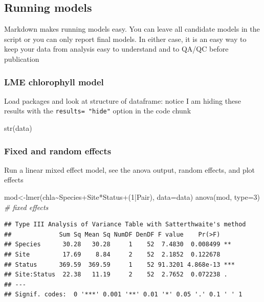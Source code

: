 \documentclass[
]{article}
\newenvironment{Shaded}{\begin{snugshade}}{\end{snugshade}}
\newcommand{\AttributeTok}[1]{\textcolor[rgb]{0.77,0.63,0.00}{#1}}
\newcommand{\CommentTok}[1]{\textcolor[rgb]{0.56,0.35,0.01}{\textit{#1}}}
\newcommand{\DecValTok}[1]{\textcolor[rgb]{0.00,0.00,0.81}{#1}}
\newcommand{\FunctionTok}[1]{\textcolor[rgb]{0.00,0.00,0.00}{#1}}
\newcommand{\NormalTok}[1]{#1}
\newcommand{\OtherTok}[1]{\textcolor[rgb]{0.56,0.35,0.01}{#1}}
\newcommand{\SpecialCharTok}[1]{\textcolor[rgb]{0.00,0.00,0.00}{#1}}
\begin{document}
\hypertarget{running-models}{%
\subsection{Running models}\label{running-models}}

Markdown makes running models easy. You can leave all candidate models
in the script or you can only report final models. In either case, it is
an easy way to keep your data from analysis easy to understand and to
QA/QC before publication

\hypertarget{lme-chlorophyll-model}{%
\subsubsection{LME chlorophyll model}\label{lme-chlorophyll-model}}

Load packages and look at structure of dataframe: notice I am hiding
these results with the \texttt{results=\ "hide"} option in the code
chunk

\begin{Shaded}
\begin{Highlighting}[]
\FunctionTok{str}\NormalTok{(data)}
\end{Highlighting}
\end{Shaded}

\hypertarget{fixed-and-random-effects}{%
\subsubsection{Fixed and random
effects}\label{fixed-and-random-effects}}

Run a linear mixed effect model, see the anova output, random effects,
and plot effects

\begin{Shaded}
\begin{Highlighting}[]
\NormalTok{mod}\OtherTok{\textless{}{-}}\FunctionTok{lmer}\NormalTok{(chla}\SpecialCharTok{\textasciitilde{}}\NormalTok{Species}\SpecialCharTok{+}\NormalTok{Site}\SpecialCharTok{*}\NormalTok{Status}\SpecialCharTok{+}\NormalTok{(}\DecValTok{1}\SpecialCharTok{|}\NormalTok{Pair), }\AttributeTok{data=}\NormalTok{data)}
\FunctionTok{anova}\NormalTok{(mod, }\AttributeTok{type=}\DecValTok{3}\NormalTok{) }\CommentTok{\# fixed effects}
\end{Highlighting}
\end{Shaded}

\begin{verbatim}
## Type III Analysis of Variance Table with Satterthwaite's method
##             Sum Sq Mean Sq NumDF DenDF F value    Pr(>F)    
## Species      30.28   30.28     1    52  7.4830  0.008499 ** 
## Site         17.69    8.84     2    52  2.1852  0.122678    
## Status      369.59  369.59     1    52 91.3201 4.868e-13 ***
## Site:Status  22.38   11.19     2    52  2.7652  0.072238 .  
## ---
## Signif. codes:  0 '***' 0.001 '**' 0.01 '*' 0.05 '.' 0.1 ' ' 1
\end{verbatim}
\end{document}
